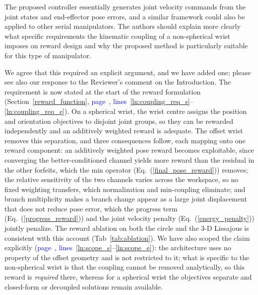 \documentclass[11pt]{elsarticle}
\newcommand{\mlines}[2]{\textcolor{blue}{page~\pageref{#1}, lines~\ref{#1}--\ref{#2}}}
\begin{document}
\begin{reviewerbox}[Comment R1.2]
The proposed controller essentially generates joint velocity commands from the joint states and end-effector pose errors, and a similar framework could also be applied to other serial manipulators. The authors should explain more clearly what specific requirements the kinematic coupling of a non-spherical wrist imposes on reward design and why the proposed method is particularly suitable for this type of manipulator.
\end{reviewerbox}

\begin{responsebox}
We agree that this required an explicit argument, and we have added one; please see also our response to the Reviewer's comment on the Introduction. The requirement is now stated at the start of the reward formulation (Section~\ref{reward_function}, \mlines{ln:coupling_req_s}{ln:coupling_req_e}). On a spherical wrist, the wrist centre assigns the position and orientation objectives to disjoint joint groups, so they can be rewarded independently and an additively weighted reward is adequate. The offset wrist removes this separation, and three consequences follow, each mapping onto one reward component: an additively weighted pose reward becomes exploitable, since converging the better-conditioned channel yields more reward than the residual in the other forfeits, which the min operator (Eq.~(\ref{final_pose_reward})) removes; the relative sensitivity of the two channels varies across the workspace, so no fixed weighting transfers, which normalization and min-coupling eliminate; and branch multiplicity makes a branch change appear as a large joint displacement that does not reduce pose error, which the progress term (Eq.~(\ref{progress_reward})) and the joint velocity penalty (Eq.~(\ref{energy_penalty})) jointly penalize. The reward ablation on both the circle and the 3-D Lissajous is consistent with this account (Tab~\ref{tab:ablation}). We have also scoped the claim explicitly (\mlines{ln:scope_s}{ln:scope_e}): the architecture uses no property of the offset geometry and is not restricted to it; what is specific to the non-spherical wrist is that the coupling cannot be removed analytically, so this reward is \emph{required} there, whereas for a spherical wrist the objectives separate and closed-form or decoupled solutions remain available.
\end{responsebox}
\end{document}
